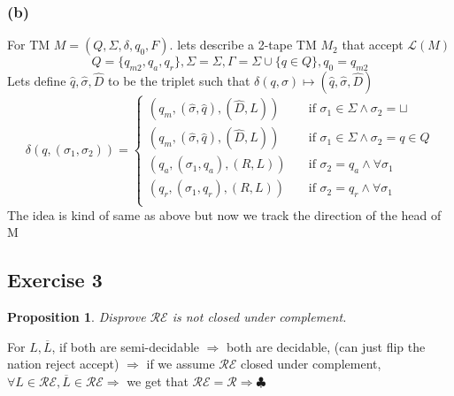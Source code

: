 \documentclass[12pt]{article}
\newtheorem{prop}{Proposition}
\begin{document}
\subsubsection*{(b)}
For TM  $M = (Q, \Sigma, \delta, q_0, F)$. lets describe a 2-tape TM $M_2$ that accept $\mathcal{L}(M)$
\[
Q=\lbrace q_{m2},q_a,q_r \rbrace,\Sigma =\Sigma ,\Gamma =\Sigma \cup\{q\in Q\} ,q_0=q_{m2}
\]
Lets define  $\hat{q},\hat{\sigma},\hat{D}$ to be the triplet such that $\delta(q,\sigma)\longmapsto (\hat{q},\hat{\sigma},\hat{D})$
\[ \delta(q,(\sigma_1,\sigma_2))=
\begin{cases} 
      (q_m,(\hat{\sigma},\hat{q}),(\hat{D},L)) &\quad\text{if  } \sigma_1 \in \Sigma \wedge\sigma_2=\sqcup\\
       (q_m,(\hat{\sigma},\hat{q}),(\hat{D},L)) &\quad\text{if } \sigma_1 \in \Sigma \wedge\sigma_2=q\in Q \\
       (q_a,(\sigma_1,q_a),(R,L)) &\quad\text{if }  \sigma_2=q_a \wedge \forall \sigma_1 \\
       (q_r,(\sigma_1,q_r),(R,L)) &\quad\text{if }\sigma_2=q_r \wedge \forall \sigma_1 \\ \end{cases}  
     \]  The idea is kind of same as above but now we track the direction of the head of M 
     \pagebreak
\subsection{Exercise 3}
\begin{prop} Disprove $\mathcal{RE}$ is not closed under complement.\end{prop}
For $L,\overline{L}$, if both are semi-decidable $\Rightarrow$ both are decidable, (can just flip the nation reject accept)
$\Rightarrow$ if we assume $\mathcal{RE}$ closed under complement, $\forall L \in \mathcal{RE}, \overline{L} \in \mathcal{RE}\Rightarrow$ we get that $\mathcal{RE}=\mathcal{R} \Rightarrow \clubsuit $
\end{document}
